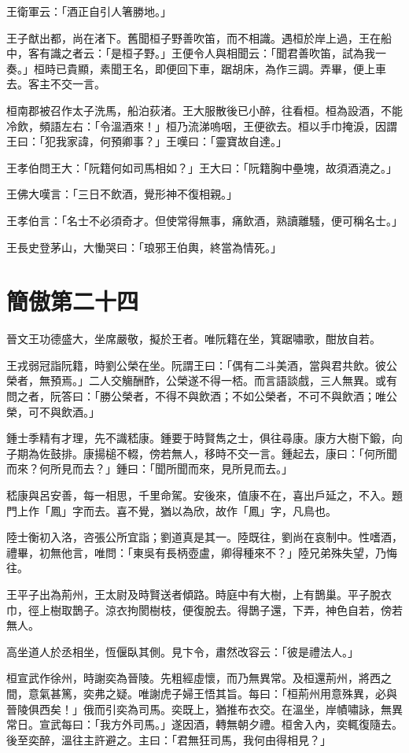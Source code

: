 王衛軍云：「酒正自引人箸勝地。」

王子猷出都，尚在渚下。舊聞桓子野善吹笛，而不相識。遇桓於岸上過，王在船中，客有識之者云：「是桓子野。」王便令人與相聞云：「聞君善吹笛，試為我一奏。」桓時已貴顯，素聞王名，即便回下車，踞胡床，為作三調。弄畢，便上車去。客主不交一言。

桓南郡被召作太子洗馬，船泊荻渚。王大服散後已小醉，往看桓。桓為設酒，不能冷飲，頻語左右：「令溫酒來！」桓乃流涕嗚咽，王便欲去。桓以手巾掩淚，因謂王曰：「犯我家諱，何預卿事？」王嘆曰：「靈寶故自達。」

王孝伯問王大：「阮籍何如司馬相如？」王大曰：「阮籍胸中壘塊，故須酒澆之。」

王佛大嘆言：「三日不飲酒，覺形神不復相親。」

王孝伯言：「名士不必須奇才。但使常得無事，痛飲酒，熟讀離騷，便可稱名士。」

王長史登茅山，大慟哭曰：「琅邪王伯輿，終當為情死。」



\chapter{簡傲第二十四}

晉文王功德盛大，坐席嚴敬，擬於王者。唯阮籍在坐，箕踞嘯歌，酣放自若。

王戎弱冠詣阮籍，時劉公榮在坐。阮謂王曰：「偶有二斗美酒，當與君共飲。彼公榮者，無預焉。」二人交觴酬酢，公榮遂不得一桮。而言語談戲，三人無異。或有問之者，阮答曰：「勝公榮者，不得不與飲酒；不如公榮者，不可不與飲酒；唯公榮，可不與飲酒。」

鍾士季精有才理，先不識嵇康。鍾要于時賢雋之士，俱往尋康。康方大樹下鍛，向子期為佐鼓排。康揚槌不輟，傍若無人，移時不交一言。鍾起去，康曰：「何所聞而來？何所見而去？」鍾曰：「聞所聞而來，見所見而去。」

嵇康與呂安善，每一相思，千里命駕。安後來，值康不在，喜出戶延之，不入。題門上作「鳳」字而去。喜不覺，猶以為欣，故作「鳳」字，凡鳥也。

陸士衡初入洛，咨張公所宜詣；劉道真是其一。陸既往，劉尚在哀制中。性嗜酒，禮畢，初無他言，唯問：「東吳有長柄壺盧，卿得種來不？」陸兄弟殊失望，乃悔往。

王平子出為荊州，王太尉及時賢送者傾路。時庭中有大樹，上有鵲巢。平子脫衣巾，徑上樹取鵲子。涼衣拘閡樹枝，便復脫去。得鵲子還，下弄，神色自若，傍若無人。

高坐道人於丞相坐，恆偃臥其側。見卞令，肅然改容云：「彼是禮法人。」

桓宣武作徐州，時謝奕為晉陵。先粗經虛懷，而乃無異常。及桓還荊州，將西之間，意氣甚篤，奕弗之疑。唯謝虎子婦王悟其旨。每曰：「桓荊州用意殊異，必與晉陵俱西矣！」俄而引奕為司馬。奕既上，猶推布衣交。在溫坐，岸幘嘯詠，無異常日。宣武每曰：「我方外司馬。」遂因酒，轉無朝夕禮。桓舍入內，奕輒復隨去。後至奕醉，溫往主許避之。主曰：「君無狂司馬，我何由得相見？」

